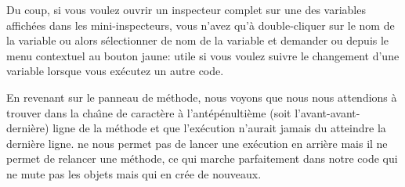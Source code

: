 \documentclass[a4paper,10pt,twoside]{book}
\begin{document}

Du coup, si vous voulez ouvrir un inspecteur complet sur une des variables
affich\'ees dans les mini-inspecteurs, vous n'avez qu'\`a double-cliquer
sur le nom de la variable ou alors s\'electionner de nom de la variable et 
demander 
  ou 
depuis le menu contextuel au bouton jaune:
utile si vous voulez suivre 
le changement d'une variable lorsque vous ex\'ecutez un autre code.

En revenant sur le panneau de m\'ethode, nous voyons que nous
nous attendions \`a trouver  dans la cha\^{\i}ne de caract\`ere
 \`a l'ant\'ep\'enulti\`eme (soit l'avant-avant-derni\`ere) 
ligne de la m\'ethode et que l'ex\'ecution n'aurait jamais du atteindre
la derni\`ere ligne.
\sq ne nous permet pas de lancer une ex\'ecution en arri\`ere mais
il ne permet de relancer une m\'ethode, ce qui marche parfaitement dans
notre code qui ne mute pas les objets mais qui en cr\'ee de nouveaux.

\end{document}
